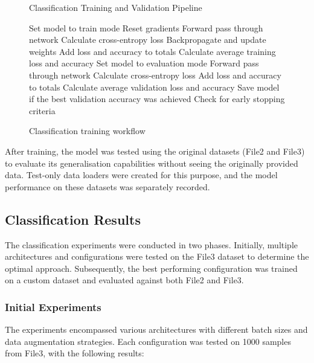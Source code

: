 \documentclass[conference]{IEEEtran}
\begin{document}
\begin{figure}[H]
\begin{algorithm}[H]
\caption{Classification Training and Validation Pipeline}
\begin{algorithmic}[1]
    \STATE Set model to train mode
        \STATE Reset gradients
        \STATE Forward pass through network
        \STATE Calculate cross-entropy loss
        \STATE Backpropagate and update weights
        \STATE Add loss and accuracy to totals
    \ENDFOR
    \STATE Calculate average training loss and accuracy
    \STATE Set model to evaluation mode
        \STATE Forward pass through network
        \STATE Calculate cross-entropy loss
        \STATE Add loss and accuracy to totals
    \ENDFOR
    \STATE Calculate average validation loss and accuracy
    \STATE Save model if the best validation accuracy was achieved
    \STATE Check for early stopping criteria
\ENDFOR
\end{algorithmic}
\end{algorithm}
\caption{Classification training workflow}
\end{figure}

After training, the model was tested using the original datasets (File2 and File3) to evaluate its
generalisation capabilities without seeing the originally provided data. Test-only data loaders were
created for this purpose, and the model performance on these datasets was separately recorded.

\subsection{Classification Results}

The classification experiments were conducted in two phases. Initially, multiple architectures
and configurations were tested on the File3 dataset to determine the optimal approach. Subsequently, the best
performing configuration was trained on a custom dataset and evaluated against both File2 and File3.

\subsubsection{Initial Experiments}

The experiments encompassed various architectures with different batch sizes and data augmentation strategies. Each
configuration was tested on 1000 samples from File3, with the following results:
\end{document}
